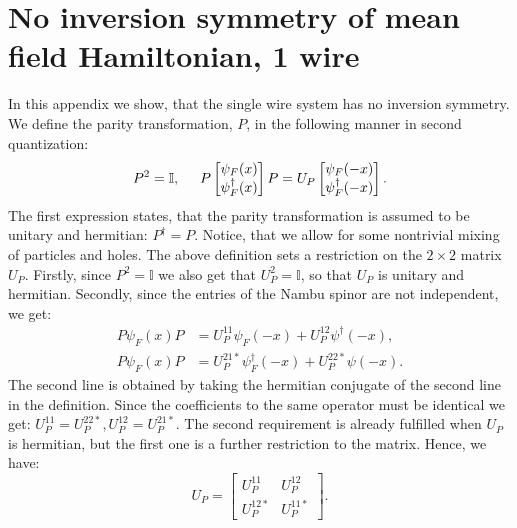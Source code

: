 
\chapter{No inversion symmetry of mean field Hamiltonian, 1 wire} %

\label{Appendix.noinversionsymmetry} %
\chead{}

In this appendix we show, that the single wire system has no inversion symmetry. We define the parity transformation, $P$, in the following manner in second quantization: 
\begin{equation}
P^2 = \mathbb{I}, \hspace{0.5cm} P\begin{bmatrix} \psi_F(x) \\ \psi^\dagger_F(x) \end{bmatrix} P = U_P\begin{bmatrix} \psi_F(-x) \\ \psi^\dagger_F(-x) \end{bmatrix}.
\label{eq.definversion}
\end{equation}
The first expression states, that the parity transformation is assumed to be unitary and hermitian: $P^\dagger = P$. Notice, that we allow for some nontrivial mixing of particles and holes. The above definition sets a restriction on the $2 \times 2$ matrix $U_P$. Firstly, since $P^2 = \mathbb{I}$ we also get that $U_P^2 = \mathbb{I}$, so that $U_P$ is unitary and hermitian. Secondly, since the entries of the Nambu spinor are not independent, we get:
\begin{align}
P\psi_F(x)P &= U_P^{11} \psi_F(-x) + U_P^{12} \psi^\dagger(-x), \nonumber \\
P\psi_F(x)P &= U_P^{21*} \psi^\dagger_F(-x) + U_P^{22*} \psi(-x). \nonumber
\end{align}
The second line is obtained by taking the hermitian conjugate of the second line in the definition. Since the coefficients to the same operator must be identical we get: $U_P^{11} = U_P^{22*}, U_P^{12} = U_P^{21*}$. The second requirement is already fulfilled when $U_P$ is hermitian, but the first one is a further restriction to the matrix. Hence, we have:
\begin{equation}
U_P = \begin{bmatrix} U_P^{11} & U_P^{12} \\ U_P^{12*} & U_P^{11*}\end{bmatrix}. 
\label{eq.UP}
\end{equation}
